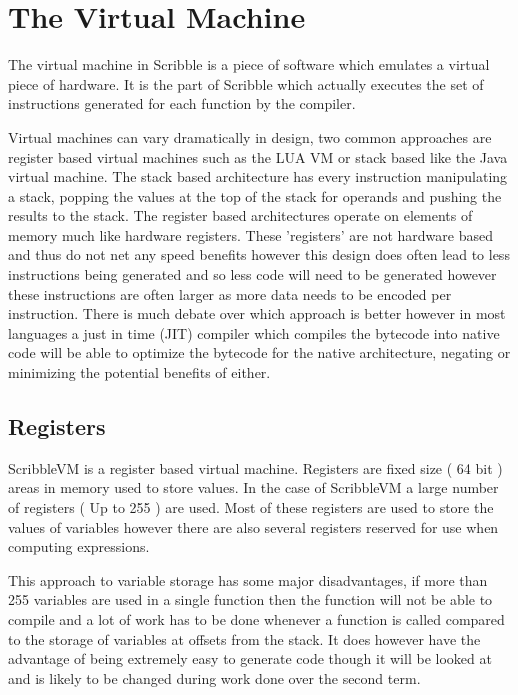 \documentclass[]{final_report}
\begin{document}
\chapter{The Virtual Machine}

The virtual machine in Scribble is a piece of software which emulates a virtual piece of hardware. It is the part of Scribble which actually executes the set of instructions generated for each function by the compiler. 

Virtual machines can vary dramatically in design, two common approaches are register based virtual machines such as the LUA VM or stack based like the Java virtual machine. The stack based architecture has every instruction manipulating a stack, popping the values at the top of the stack for operands and pushing the results to the stack. The register based architectures operate on elements of memory much like hardware registers. These 'registers' are not hardware based and thus do not net any speed benefits however this design does often lead to less instructions being generated and so less code will need to be generated however these instructions are often larger as more data needs to be encoded per instruction. There is much debate over which approach is better however in most languages a just in time (JIT) compiler which compiles the bytecode into native code will be able to optimize the bytecode for the native architecture, negating or minimizing the potential benefits of either.

\section{Registers}

ScribbleVM is a register based virtual machine. Registers are fixed size ( 64 bit ) areas in memory used to
store values. In the case of ScribbleVM a large number of registers ( Up to 255 ) are used. Most of these
registers are used to store the values of variables however there are also several registers reserved for use when computing expressions.

This approach to variable storage has some major disadvantages, if more than 255 variables are used in a single function then the function will not be able to compile and a lot of work has to be done whenever a function is called compared to the storage of variables at offsets from the stack. It does however have the advantage of being extremely easy to generate code though it will be looked at and is likely to be changed during work done over the second term.
\end{document}
